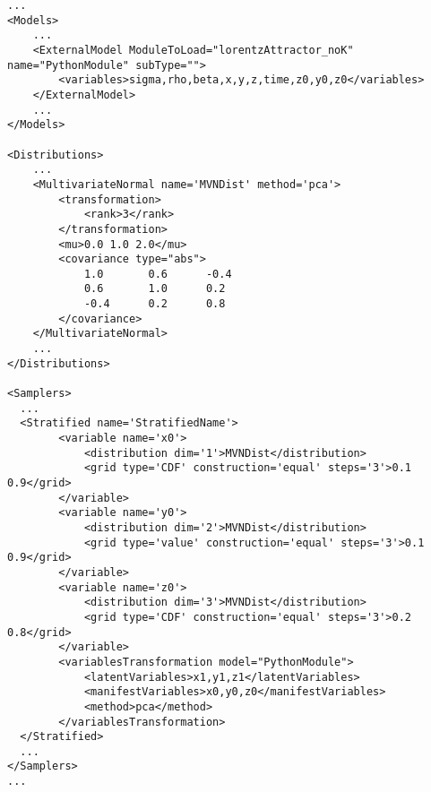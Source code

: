 \begin{lstlisting}[style=XML,morekeywords={ND,grid}]
...
<Models>
    ...
    <ExternalModel ModuleToLoad="lorentzAttractor_noK" name="PythonModule" subType="">
        <variables>sigma,rho,beta,x,y,z,time,z0,y0,z0</variables>
    </ExternalModel>
    ...
</Models>

<Distributions>
    ...
    <MultivariateNormal name='MVNDist' method='pca'>
        <transformation>
            <rank>3</rank>
        </transformation>
        <mu>0.0 1.0 2.0</mu>
        <covariance type="abs">
            1.0       0.6      -0.4
            0.6       1.0      0.2
            -0.4      0.2      0.8
        </covariance>
    </MultivariateNormal>
    ...
</Distributions>

<Samplers>
  ...
  <Stratified name='StratifiedName'>
        <variable name='x0'>
            <distribution dim='1'>MVNDist</distribution>
            <grid type='CDF' construction='equal' steps='3'>0.1 0.9</grid>
        </variable>
        <variable name='y0'>
            <distribution dim='2'>MVNDist</distribution>
            <grid type='value' construction='equal' steps='3'>0.1 0.9</grid>
        </variable>
        <variable name='z0'>
            <distribution dim='3'>MVNDist</distribution>
            <grid type='CDF' construction='equal' steps='3'>0.2 0.8</grid>
        </variable>
        <variablesTransformation model="PythonModule">
            <latentVariables>x1,y1,z1</latentVariables>
            <manifestVariables>x0,y0,z0</manifestVariables>
            <method>pca</method>
        </variablesTransformation>
  </Stratified>
  ...
</Samplers>
...
\end{lstlisting}

